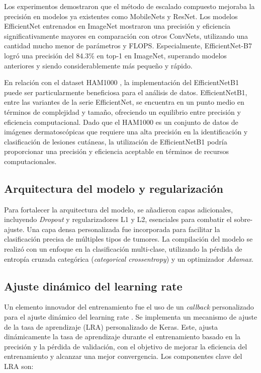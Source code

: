 Los experimentos demostraron que el método de escalado compuesto mejoraba la precisión en modelos ya existentes como MobileNets y ResNet. Los modelos EfficientNet entrenados en ImageNet mostraron una precisión y eficiencia significativamente mayores en comparación con otros ConvNets, utilizando una cantidad mucho menor de parámetros y FLOPS. Especialmente, EfficientNet-B7 logró una precisión del 84.3\% en top-1 en ImageNet, superando modelos anteriores y siendo considerablemente más pequeño y rápido.

En relación con el dataset HAM1000 , la implementación del EfficientNetB1 puede ser particularmente beneficiosa para el análisis de datos. EfficientNetB1, entre las variantes de la serie EfficientNet, se encuentra en un punto medio en términos de complejidad y tamaño, ofreciendo un equilibrio entre precisión y eficiencia computacional. Dado que el HAM1000 es un conjunto de datos de imágenes dermatoscópicas que requiere una alta precisión en la identificación y clasificación de lesiones cutáneas, la utilización de EfficientNetB1 podría proporcionar una precisión y eficiencia aceptable en términos de recursos computacionales.

\subsection{Arquitectura del modelo y regularización}

Para fortalecer la arquitectura del modelo, se añadieron capas adicionales, incluyendo \textit{Dropout} y regularizadores L1 y L2, esenciales para combatir el sobre-ajuste. Una capa densa personalizada fue incorporada para facilitar la clasificación precisa de múltiples tipos de tumores. La compilación del modelo se realizó con un enfoque en la clasificación multi-clase, utilizando la pérdida de entropía cruzada categórica (\textit{categorical crossentropy}) y un optimizador \textit{Adamax}.

\subsection{Ajuste dinámico del learning rate}

Un elemento innovador del entrenamiento fue el uso de un \textit{callback} personalizado para el ajuste dinámico del learning rate . Se implementa un mecanismo de ajuste de la tasa de aprendizaje (LRA) personalizado de Keras. Este, ajusta dinámicamente la tasa de aprendizaje durante el entrenamiento basado en la precisión y la pérdida de validación, con el objetivo de mejorar la eficiencia del entrenamiento y alcanzar una mejor convergencia. Los componentes clave del LRA son:

